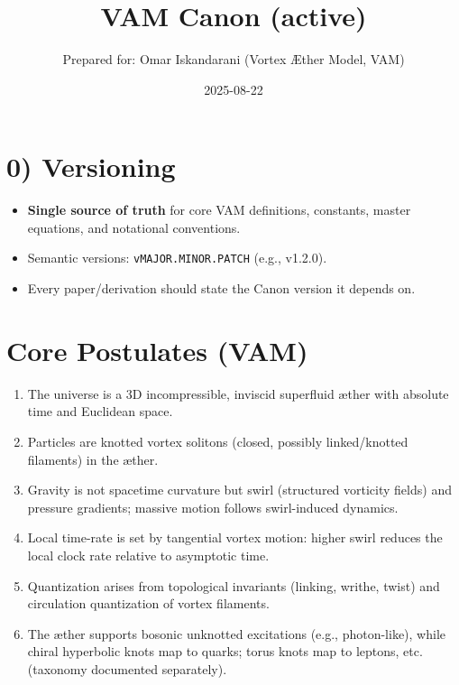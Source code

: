 \documentclass[11pt,a4paper]{article}
\title{\bfseries VAM Canon (active)}
\author{Prepared for: Omar Iskandarani (Vortex Æther Model, VAM)}
\date{2025-08-22}
\begin{document}
    \maketitle

    \section*{0) Versioning}
    \begin{itemize}
        \item \textbf{Single source of truth} for core VAM definitions, constants, master equations, and notational conventions.
        \item Semantic versions: \texttt{vMAJOR.MINOR.PATCH} (e.g., v1.2.0).
        \item Every paper/derivation should state the Canon version it depends on.
    \end{itemize}

    \section{Core Postulates (VAM)}
    \begin{enumerate}
        \item The universe is a 3D incompressible, inviscid superfluid æther with absolute time and Euclidean space.
        \item Particles are knotted vortex solitons (closed, possibly linked/knotted filaments) in the æther.
        \item Gravity is not spacetime curvature but swirl (structured vorticity fields) and pressure gradients; massive motion follows swirl-induced dynamics.
        \item Local time-rate is set by tangential vortex motion: higher swirl reduces the local clock rate relative to asymptotic time.
        \item Quantization arises from topological invariants (linking, writhe, twist) and circulation quantization of vortex filaments.
        \item The æther supports bosonic unknotted excitations (e.g., photon-like), while chiral hyperbolic knots map to quarks; torus knots map to leptons, etc. (taxonomy documented separately).
    \end{enumerate}

\end{document}
